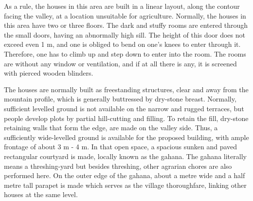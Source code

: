 As a rule, the houses in this area are built in a linear layout, along the contour facing the valley, at a location unsuitable for agriculture. Normally, the houses in this area have two or three floors. The dark and stuffy rooms are entered through the small doors, having an abnormally high sill. The height of this door does not exceed even 1 m, and one is obliged to bend on one’s knees to enter through it. Therefore, one has to climb up and step down to enter into the room. The rooms are without any window or ventilation, and if at all there is any, it is screened with pierced wooden blinders.

The houses are normally built as freestanding structures, clear and away from the mountain profile, which is generally buttressed by dry-stone breast. Normally, sufficient levelled ground is not available on the narrow and rugged terraces, but people develop plots by partial hill-cutting and filling. To retain the fill, dry-stone retaining walls that form the edge, are made on the valley side. Thus, a sufficiently wide-levelled ground is available for the proposed building, with ample frontage of about 3 m - 4 m. In that open space, a spacious sunken and paved rectangular courtyard is made, locally known as the gahana. The gahana literally means a threshing-yard but besides threshing, other agrarian chores are also performed here. On the outer edge of the gahana, about a metre wide and a half metre tall parapet is made which serves as the village thoroughfare, linking other houses at the same level.

